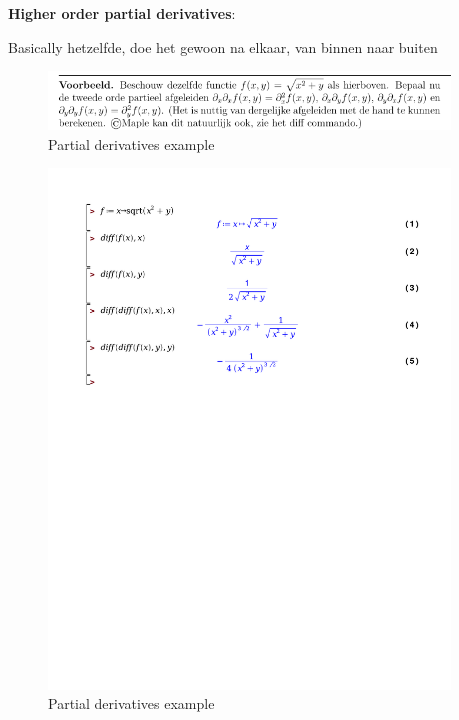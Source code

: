 \documentclass[a4paper]{article}
\begin{document}
\textbf{Higher order partial derivatives}:

Basically hetzelfde, doe het gewoon na elkaar, van binnen naar buiten

\begin{figure}[H]
	\begin{center}
		\includegraphics[width=0.95\textwidth]{./images/partial_2.png}
	\end{center}
	\caption{Partial derivatives example}
	\label{}
\end{figure}

\begin{figure}[H]
	\begin{center}
		\includegraphics[width=0.95\textwidth]{./partial_2.pdf}
	\end{center}
	\caption{Partial derivatives example}
	\label{}
\end{figure}
\end{document}
